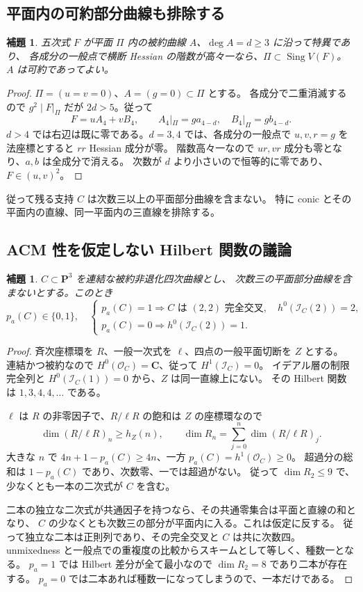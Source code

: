 \documentclass[11pt,a4paper]{ltjsarticle}
\newcommand{\CC}{\mathbf C}\newcommand{\QQ}{\mathbf Q}
\newcommand{\PP}{\mathbf P}\renewcommand{\AA}{\mathbf A}
\newcommand{\OO}{\mathcal O}\newcommand{\FF}{\mathcal F}
\newtheorem{lemma}[theorem]{補題}
\theoremstyle{remark}\newtheorem{remark}[theorem]{注意}
\begin{document}
\subsection{平面内の可約部分曲線も排除する}

\begin{lemma}\label{lem:plane-v21}
五次式 $F$ が平面 $\Pi$ 内の被約曲線 $A$、$\deg A=d\ge3$ に沿って特異であり、
各成分の一般点で横断 Hessian の階数が高々一なら、$\Pi\subset\operatorname{Sing}V(F)$。
$A$ は可約であってよい。
\end{lemma}
\begin{proof}
$\Pi=(u=v=0)$、$A=(g=0)\subset\Pi$ とする。
各成分で二重消滅するので $g^2\mid F|_\Pi$ だが $2d>5$。従って
\[
F=uA_4+vB_4,\qquad A_4|_\Pi=g a_{4-d},\quad B_4|_\Pi=g b_{4-d}.
\]
$d>4$ では右辺は既に零である。$d=3,4$ では、各成分の一般点で
$u,v,r=g$ を法座標とすると $rr$ Hessian 成分が零。
階数高々一なので $ur,vr$ 成分も零となり、$a,b$ は全成分で消える。
次数が $d$ より小さいので恒等的に零であり、$F\in(u,v)^2$。
\end{proof}

従って残る支持 $C$ は次数三以上の平面部分曲線を含まない。
特に conic とその平面内の直線、同一平面内の三直線を排除する。

\subsection{ACM 性を仮定しない Hilbert 関数の議論}

\begin{lemma}\label{lem:hilbert-v21}
$C\subset\PP^3$ を連結な被約非退化四次曲線とし、
次数三の平面部分曲線を含まないとする。このとき
\[
p_a(C)\in\{0,1\},\quad
\begin{cases}
p_a(C)=1 \Longrightarrow C\text{ は }(2,2)\text{ 完全交叉},\quad h^0(\mathcal I_C(2))=2,\\
p_a(C)=0 \Longrightarrow h^0(\mathcal I_C(2))=1.
\end{cases}
\]
\end{lemma}
\begin{proof}
斉次座標環を $R$、一般一次式を $\ell$、四点の一般平面切断を $Z$ とする。
連結かつ被約なので $H^0(\OO_C)=\CC$、従って $H^1(\mathcal I_C)=0$。
イデアル層の制限完全列と $H^0(\mathcal I_C(1))=0$ から、$Z$ は同一直線上にない。
その Hilbert 関数は $1,3,4,4,\ldots$ である。

$\ell$ は $R$ の非零因子で、$R/\ell R$ の飽和は $Z$ の座標環なので
\[
\dim(R/\ell R)_n\ge h_Z(n),\qquad
\dim R_n=\sum_{j=0}^n\dim(R/\ell R)_j.
\]
大きな $n$ で $4n+1-p_a(C)\ge4n$、一方 $p_a(C)=h^1(\OO_C)\ge0$。
超過分の総和は $1-p_a(C)$ であり、次数零、一では超過がない。
従って $\dim R_2\le9$ で、少なくとも一本の二次式が $C$ を含む。

二本の独立な二次式が共通因子を持つなら、その共通零集合は平面と直線の和となり、
$C$ の少なくとも次数三の部分が平面内に入る。これは仮定に反する。
従って独立な二本は正則列であり、その完全交叉と $C$ は共に次数四。
unmixedness と一般点での重複度の比較からスキームとして等しく、種数一となる。
$p_a=1$ では Hilbert 差分が全て最小なので $\dim R_2=8$ であり二本が存在する。
$p_a=0$ では二本あれば種数一になってしまうので、一本だけである。
\end{proof}
\end{document}
